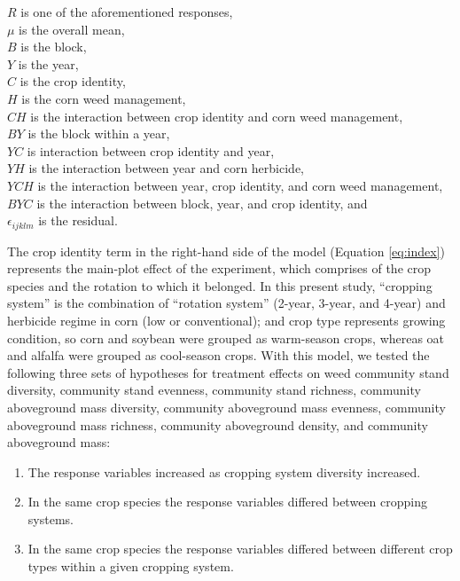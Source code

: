 \documentclass[
]{article}
\begin{document}
\(R\) is one of the aforementioned responses,\\
\(\mu\) is the overall mean,\\
\(B\) is the block,\\
\(Y\) is the year,\\
\(C\) is the crop identity,\\
\(H\) is the corn weed management,\\
\(CH\) is the interaction between crop identity and corn weed management,\\
\(BY\) is the block within a year,\\
\(YC\) is interaction between crop identity and year,\\
\(YH\) is the interaction between year and corn herbicide,\\
\(YCH\) is the interaction between year, crop identity, and corn weed management,\\
\(BYC\) is the interaction between block, year, and crop identity, and\\
\(\epsilon_{ijklm}\) is the residual.

The crop identity term in the right-hand side of the model (Equation \eqref{eq:index}) represents the main-plot effect of the experiment, which comprises of the crop species and the rotation to which it belonged. In this present study, ``cropping system'' is the combination of ``rotation system'' (2-year, 3-year, and 4-year) and herbicide regime in corn (low or conventional); and crop type represents growing condition, so corn and soybean were grouped as warm-season crops, whereas oat and alfalfa were grouped as cool-season crops. With this model, we tested the following three sets of hypotheses for treatment effects on weed community stand diversity, community stand evenness, community stand richness, community aboveground mass diversity, community aboveground mass evenness, community aboveground mass richness, community aboveground density, and community aboveground mass:

\begin{enumerate}
\def\labelenumi{\arabic{enumi})}
\item
  The response variables increased as cropping system diversity increased.
\item
  In the same crop species the response variables differed between cropping systems.
\item
  In the same crop species the response variables differed between different crop types within a given cropping system.
\end{enumerate}
\end{document}
